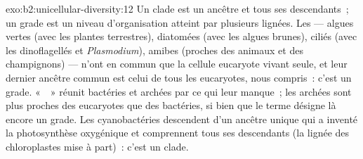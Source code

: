 \begin{solution}{exo:b2:unicellular-diversity:12}
Un clade est un ancêtre et tous ses descendants~; un grade est un
niveau d'organisation atteint par plusieurs lignées. Les  ---
algues vertes (avec les plantes terrestres), diatomées (avec les algues
brunes), ciliés (avec les dinoflagellés et \emph{Plasmodium}), amibes
(proches des animaux et des champignons) --- n'ont en commun que la
cellule eucaryote vivant seule, et leur dernier ancêtre commun est celui
de tous les eucaryotes, nous compris~: c'est un grade. «~~»
réunit bactéries et archées par ce qui leur manque~; les archées sont
plus proches des eucaryotes que des bactéries, si bien que le terme
désigne là encore un grade. Les cyanobactéries descendent d'un ancêtre
unique qui a inventé la photosynthèse oxygénique et comprennent tous ses
descendants (la lignée des chloroplastes mise à part)~: c'est un clade.
\end{solution}

